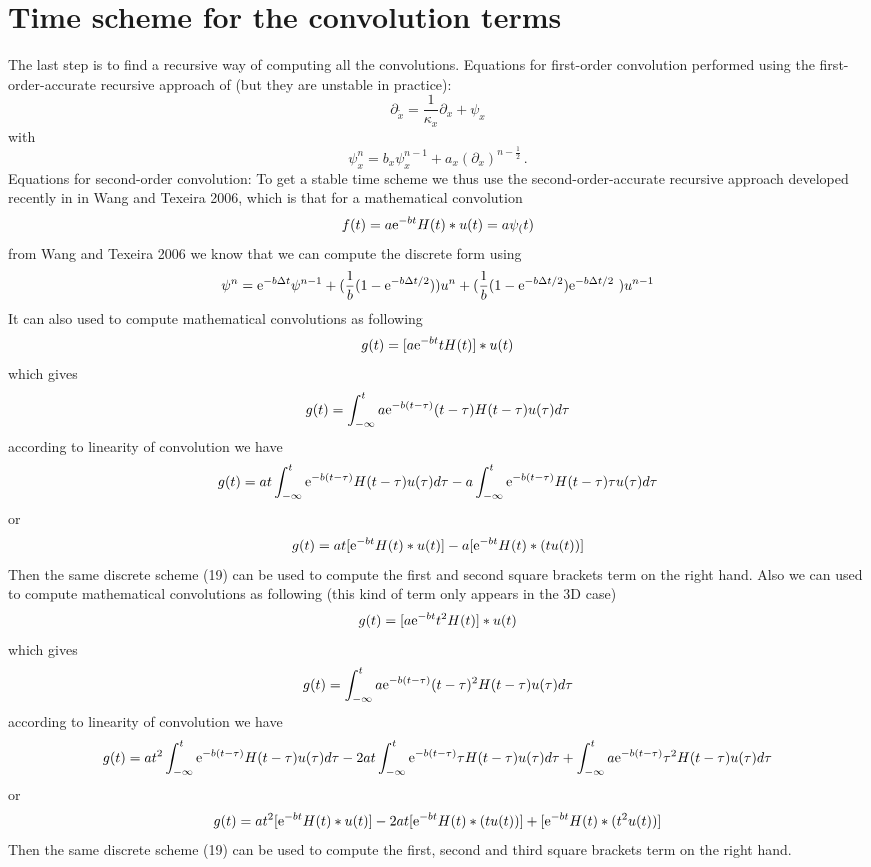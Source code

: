 \documentclass[onecolumn,extra]{gji_modified_cours_UPPA}
\renewcommand{\cite}[1]{\citet{#1}}
\begin{document}
\section{Time scheme for the convolution terms}
The last step is to find a recursive way of computing all the convolutions.
Equations for first-order convolution
performed using the first-order-accurate recursive approach of \cite{LuHu92}
(but they are unstable in practice):
\begin{equation}
\partial_{\tilde{x}} = \frac{1}{\kappa_x} \partial_ x + \psi_x
\label{memory_variable_replace}
\end{equation}
%
with
\begin{equation}
\psi_x^n = b_x \psi_x^{n - 1} + a_x \left(\partial_ x\right)^{n - \frac{1}{2}} \, .
\label{time_evolution_psi}
\end{equation}
%
Equations for second-order convolution:
%
To get a stable time scheme we thus use the second-order-accurate recursive approach developed recently in in Wang and Texeira 2006,
which is that for a mathematical convolution
$$f(t) = a {\rm e}^{-bt} H(t) * u(t) = a \psi_(t)$$
from Wang and Texeira 2006 we know that we can compute the discrete form using
\begin{equation}
\psi^n = {\rm e}^{-b \Delta t} \psi^{n-1} + (\frac{1}{b} (1 - {\rm e}^{-b \Delta t /2})) u^n
+ (\frac{1}{b} (1 - {\rm e}^{-b \Delta t /2 }) {\rm e}^{-b \Delta t /2} \ ) u^{n-1}
\end{equation}
%
It can also used to compute mathematical convolutions as following
$$g(t) = [a {\rm e}^{-bt} t H(t)] * u(t)$$
which gives
$$g(t) = \int_{-\infty}^{t} a {\rm e}^{-b (t-\tau)} (t-\tau) H(t-\tau) u(\tau) d \tau$$
according to linearity of convolution we have
$$g(t) = at\int_{-\infty}^{t}  {\rm e}^{-b (t-\tau)} H(t-\tau) u(\tau) d \tau - a\int_{-\infty}^{t}  {\rm e}^{-b (t-\tau)} H(t-\tau) \tau u(\tau) d \tau $$
or
$$g(t) = at [  {\rm e}^{-bt} H(t) * u(t)] - a [ {\rm e}^{-bt} H(t) * (t u(t))] $$
Then the same discrete scheme (19) can be used to compute the first and second  square brackets term on the right hand.
%
Also we can used to compute mathematical convolutions as following (this kind of term only appears in the 3D case)
$$g(t) = [a {\rm e}^{-bt} t^2 H(t)] * u(t)$$
which gives
$$g(t) = \int_{-\infty}^{t} a {\rm e}^{-b (t-\tau)} (t-\tau)^2 H(t-\tau) u(\tau) d \tau$$
according to linearity of convolution we have
$$g(t) = at^2\int_{-\infty}^{t}  {\rm e}^{-b (t-\tau)}  H(t-\tau) u(\tau) d \tau -
2at\int_{-\infty}^{t}  {\rm e}^{-b (t-\tau)}  \tau H(t-\tau) u(\tau) d \tau+
\int_{-\infty}^{t} a {\rm e}^{-b (t-\tau)} \tau^2 H(t-\tau) u(\tau) d \tau$$
or
$$g(t) = at^2[{\rm e}^{-bt} H(t) * u(t)] -
2at[{\rm e}^{-bt} H(t) * (t u(t))]+
[ {\rm e}^{-bt} H(t) * (t^2 u(t))]$$
Then the same discrete scheme (19) can be used to compute the first, second and third square brackets term on the right hand.
%
%
%
%
%
%

%
\end{document}
